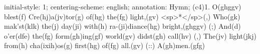 initial-style: 1;
centering-scheme: english;
annotation: Hymn;
(c4)1. O(ghggv) blest(f) Cre(hj)a(jv)tor(g) of(hg) the(fg) light,(gv) <sp>*</sp>(,) 
Who(gk) mak'st(klk) the(j) day(ji) with(h) ra-(ji)diance(hg) bright,(ghggv) (;) 
And(d) o'er(dfe) the(fg) form(gh)ing(gf) world(gv) didst(gh) call(hv) (,) 
The(jv) light(jkj) from(h) cha(ixih)os(g) first(hg) of(fg) all.(gv) (::)
A(gh)men.(gfg)